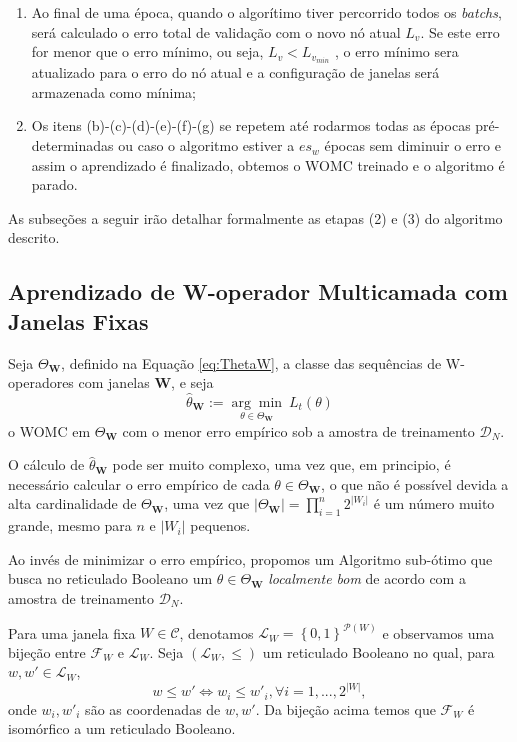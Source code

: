\begin{enumerate}
\begin{enumerate}
        \item Ao final de uma época, quando o algorítimo tiver percorrido todos os \textit{batchs}, será calculado o erro total de validação com o novo nó atual $L_{v}$. Se este erro for menor que o erro mínimo, ou seja, $L_{v}< L_{v_{min}}$ , o erro mínimo sera atualizado para o erro do nó atual e a configuração de janelas será armazenada como mínima;
        \item Os itens (b)-(c)-(d)-(e)-(f)-(g) se repetem até rodarmos todas as épocas pré-determinadas ou caso o algoritmo estiver a $es_w$ épocas sem diminuir o erro e assim o aprendizado é finalizado, obtemos o WOMC treinado e o algoritmo é parado.
    \end{enumerate}
\end{enumerate}

As subseções a seguir irão detalhar formalmente as etapas (2) e (3) do algoritmo descrito.

\subsection{Aprendizado de W-operador Multicamada com Janelas Fixas}

Seja $\Theta_{\textbf{W}}$, definido na Equação \ref{eq:ThetaW}, a classe das sequências de W-operadores com janelas $\textbf{W}$, e seja
$$\hat{\theta}_{\textbf{W}}:= \underset{\theta \in \Theta_{\textbf{W}}}{\arg \min } \ L_{t} \left( \theta \right)$$
o WOMC em $\Theta_{\textbf{W}}$ com o menor erro empírico sob a amostra de treinamento $\mathcal{D}_{N}$.

O cálculo de $\hat{\theta}_{\textbf{W}}$ pode ser muito complexo, uma vez que, em principio, é necessário calcular o erro empírico de cada $\theta \in \Theta_{\textbf{W}}$, o que não é possível devida a alta cardinalidade de $\Theta_{\textbf{W}}$, uma vez que $|\Theta_{\textbf{W}}| = \prod_{i=1}^{n} 2^{|W_{i}|}$ é um número muito grande, mesmo para $n$ e $|W_{i}|$ pequenos.

Ao invés de minimizar o erro empírico, propomos um Algoritmo sub-ótimo que busca no reticulado Booleano um $\theta \in \Theta_{\textbf{W}}$ \textit{localmente bom} de acordo com a amostra de treinamento $\mathcal{D}_{N}$.

Para uma janela fixa $W \in \mathscr{C}$, denotamos $\mathscr{L}_{W} = \left\{ 0,1 \right\}^{\mathcal{P}(W)} $ e observamos uma bijeção entre $ \mathcal{F}_{W} $ e $\mathscr{L}_{W}$. Seja $ \left( \mathscr{L}_{W} , \leq \right)  $ um reticulado Booleano no qual, para $w, w' \in  \mathscr{L}_{W}$,
$$w \leq w' \iff w_{i}  \leq w'_{i}, \forall i = 1,...,2^{|W|}, $$
onde $ w_{i}, w'_{i} $ são as coordenadas de $ w, w'$. Da bijeção acima temos que $ \mathcal{F}_{W} $ é isomórfico a um reticulado Booleano.

